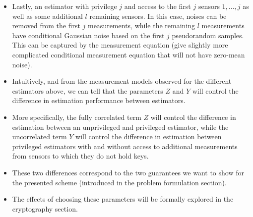 \documentclass[conference]{IEEEtran}
\begin{document}
\begin{itemize}
  
  \item Lastly, an estimator with privilege $j$ and access to the first $j$ sensors $1,...,j$ as well as some additional $l$ remaining sensors. In this case, noises can be removed from the first $j$ measurements, while the remaining $l$ measurements have conditional Gaussian noise based on the first $j$ pseudorandom samples. This can be captured by the measurement equation (give slightly more complicated conditional measurement equation that will not have zero-mean noise).
  \item Intuitively, and from the measurement models observed for the different estimators above, we can tell that the parameters $Z$ and $Y$ will control the difference in estimation performance between estimators.
  \item More specifically, the fully correlated term $Z$ will control the difference in estimation between an unprivileged and privileged estimator, while the uncorrelated term $Y$ will control the difference in estimation between privileged estimators with and without access to additional measurements from sensors to which they do not hold keys.
  \item These two differences correspond to the two guarantees we want to show for the presented scheme (introduced in the problem formulation section).
  \item The effects of choosing these parameters will be formally explored in the cryptography section.
\end{itemize}
\end{document}
